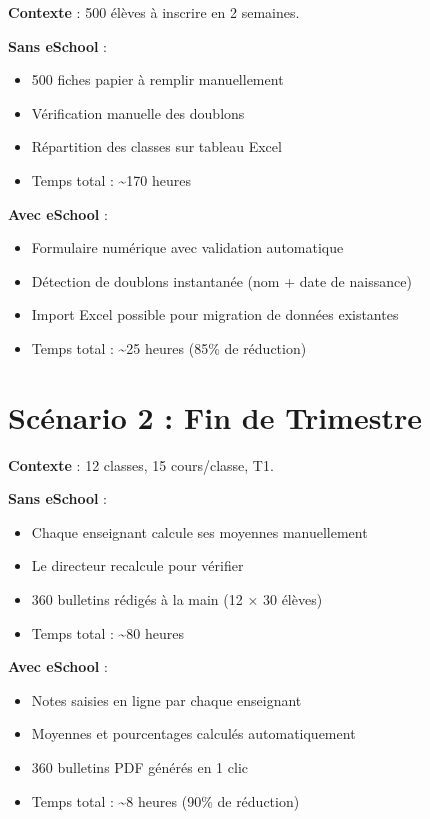 \documentclass[12pt,a4paper,oneside]{report}
\begin{document}
\begin{scenario}
\textbf{Contexte} : 500 élèves à inscrire en 2 semaines.

\textbf{Sans eSchool} : 
\begin{itemize}[topsep=0pt]
  \item 500 fiches papier à remplir manuellement
  \item Vérification manuelle des doublons
  \item Répartition des classes sur tableau Excel
  \item Temps total : \textasciitilde170 heures
\end{itemize}

\textbf{Avec eSchool} :
\begin{itemize}[topsep=0pt]
  \item Formulaire numérique avec validation automatique
  \item Détection de doublons instantanée (nom + date de naissance)
  \item Import Excel possible pour migration de données existantes
  \item Temps total : \textasciitilde25 heures (85\% de réduction)
\end{itemize}
\end{scenario}

\section{Scénario 2 : Fin de Trimestre}

\begin{scenario}
\textbf{Contexte} : 12 classes, 15 cours/classe, T1.

\textbf{Sans eSchool} :
\begin{itemize}[topsep=0pt]
  \item Chaque enseignant calcule ses moyennes manuellement
  \item Le directeur recalcule pour vérifier
  \item 360 bulletins rédigés à la main (12 × 30 élèves)
  \item Temps total : \textasciitilde80 heures
\end{itemize}

\textbf{Avec eSchool} :
\begin{itemize}[topsep=0pt]
  \item Notes saisies en ligne par chaque enseignant
  \item Moyennes et pourcentages calculés automatiquement
  \item 360 bulletins PDF générés en 1 clic
  \item Temps total : \textasciitilde8 heures (90\% de réduction)
\end{itemize}
\end{scenario}
\end{document}
